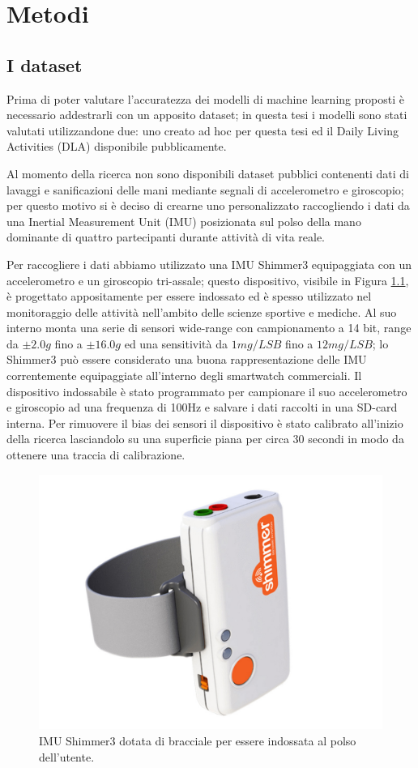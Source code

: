 \chapter{Metodi}
\label{cap:metodi}

\section{I dataset}
\label{sec:dataset}

Prima di poter valutare l'accuratezza dei modelli di machine learning proposti è necessario addestrarli con un apposito dataset; in questa tesi i modelli sono stati valutati utilizzandone due: uno creato ad hoc per questa tesi ed il Daily Living Activities (DLA) disponibile pubblicamente\cite{leotta2021daily}.

Al momento della ricerca non sono disponibili dataset pubblici contenenti dati di lavaggi e sanificazioni delle mani mediante segnali di accelerometro e giroscopio; per questo motivo si è deciso di crearne uno personalizzato raccogliendo i dati da una Inertial Measurement Unit (IMU) posizionata sul polso della mano dominante di quattro partecipanti durante attività di vita reale.

Per raccogliere i dati abbiamo utilizzato una IMU Shimmer3 equipaggiata con un accelerometro e un giroscopio tri-assale\cite{shimmer}; questo dispositivo, visibile in Figura \ref{fig:shimmer}, è progettato appositamente per essere indossato ed è spesso utilizzato nel monitoraggio delle attività nell'ambito delle scienze sportive e mediche. Al suo interno monta una serie di sensori wide-range con campionamento a 14 bit, range da $\pm2.0g$ fino a $\pm16.0g$ ed una sensitività da $1mg/LSB$ fino a $12mg/LSB$; lo Shimmer3 può essere considerato una buona rappresentazione delle IMU correntemente equipaggiate all'interno degli smartwatch commerciali. Il dispositivo indossabile è stato programmato per campionare il suo accelerometro e giroscopio ad una frequenza di 100Hz e salvare i dati raccolti in una SD-card interna. Per rimuovere il bias dei sensori il dispositivo è stato calibrato all'inizio della ricerca lasciandolo su una superficie piana per circa 30 secondi in modo da ottenere una traccia di calibrazione.

\begin{figure}[!htb]
    \centering
    \includegraphics[width=.4\textwidth]{figure/shimmer.jpg}
    \caption{IMU Shimmer3 dotata di bracciale per essere indossata al polso dell'utente.}
    \label{fig:shimmer}
\end{figure}

